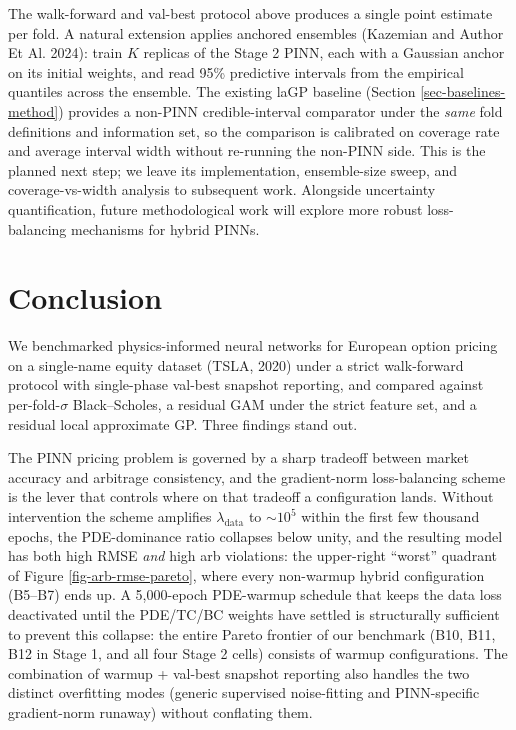 \documentclass[
  11pt,
]{article}
\begin{document}
The walk-forward and val-best protocol above produces a single point
estimate per fold. A natural extension applies anchored ensembles
(Kazemian and Author Et Al. 2024): train \(K\) replicas of the Stage 2
PINN, each with a Gaussian anchor on its initial weights, and read 95\%
predictive intervals from the empirical quantiles across the ensemble.
The existing laGP baseline (Section \ref{sec-baselines-method}) provides
a non-PINN credible-interval comparator under the \emph{same} fold
definitions and information set, so the comparison is calibrated on
coverage rate and average interval width without re-running the non-PINN
side. This is the planned next step; we leave its implementation,
ensemble-size sweep, and coverage-vs-width analysis to subsequent work.
Alongside uncertainty quantification, future methodological work will
explore more robust loss-balancing mechanisms for hybrid PINNs.

\section{Conclusion}\label{sec-conclusion}

We benchmarked physics-informed neural networks for European option
pricing on a single-name equity dataset (TSLA, 2020) under a strict
walk-forward protocol with single-phase val-best snapshot reporting, and
compared against per-fold-\(\sigma\) Black--Scholes, a residual GAM
under the strict feature set, and a residual local approximate GP. Three
findings stand out.

The PINN pricing problem is governed by a sharp tradeoff between market
accuracy and arbitrage consistency, and the gradient-norm loss-balancing
scheme is the lever that controls where on that tradeoff a configuration
lands. Without intervention the scheme amplifies
\(\lambda_\mathrm{data}\) to \(\sim 10^{5}\) within the first few
thousand epochs, the PDE-dominance ratio collapses below unity, and the
resulting model has both high RMSE \emph{and} high arb violations: the
upper-right ``worst'' quadrant of Figure \ref{fig-arb-rmse-pareto},
where every non-warmup hybrid configuration (B5--B7) ends up. A
5,000-epoch PDE-warmup schedule that keeps the data loss deactivated
until the PDE/TC/BC weights have settled is structurally sufficient to
prevent this collapse: the entire Pareto frontier of our benchmark (B10,
B11, B12 in Stage 1, and all four Stage 2 cells) consists of warmup
configurations. The combination of warmup + val-best snapshot reporting
also handles the two distinct overfitting modes (generic supervised
noise-fitting and PINN-specific gradient-norm runaway) without
conflating them.
\end{document}
